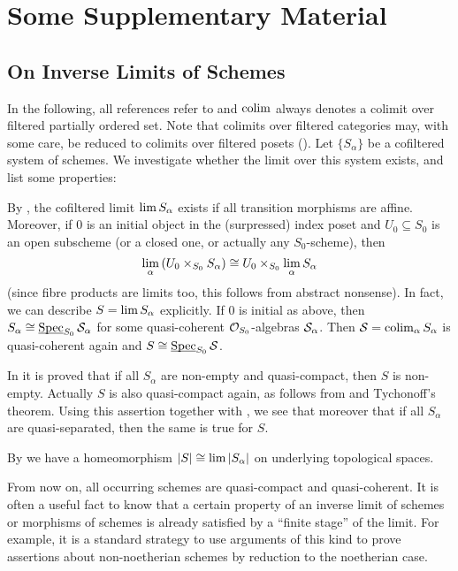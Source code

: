 \chapter{Some Supplementary Material}

\section{On Inverse Limits of Schemes}\label{sec:inverseLimits}
In the following, all references refer to \cite{stacks-project} and $\operatorname*{colim}$ always denotes a colimit over filtered partially ordered set. Note that colimits over filtered categories may, with some care, be reduced to colimits over filtered posets ().
\numpar{}\label{par:schemesInverseLimit}Let $\{S_\alpha\}$ be a cofiltered system of schemes. We investigate whether the limit over this system exists, and list some properties:
\begin{alphanumerate}
	\item By , the cofiltered limit $\operatorname*{lim} S_\alpha$ exists if all transition morphisms are affine. Moreover, if $0$ is an initial object in the (surpressed) index poset and $U_0\subseteq S_0$ is an open subscheme (or a closed one, or actually any $S_0$-scheme), then
	\begin{equation*}
	\operatorname*{lim}_\alpha \left(U_0\times_{S_0}S_\alpha\right)\cong U_0\times_{S_0}\operatorname*{lim}_\alpha S_\alpha
	\end{equation*}
	(since fibre products are limits too, this follows from abstract nonsense). In fact, we can describe $S=\operatorname*{lim} S_\alpha$ explicitly. If $0$ is initial as above, then $S_\alpha\cong \operatorname{\underline{\smash{\mathrm{Spec}}}}_{S_0}\mathcal{S}_\alpha$ for some quasi-coherent $\mathcal{O}_{S_0}$-algebras $\mathcal{S}_\alpha$. Then $\mathcal{S}=\operatorname*{colim}_\alpha S_\alpha$ is quasi-coherent again and $S\cong \operatorname{\underline{\smash{\mathrm{Spec}}}}_{S_0}\mathcal{S}$.
	\item In  it is proved that if all $S_\alpha$ are non-empty and quasi-compact, then $S$ is non-empty. Actually $S$ is also quasi-compact again, as follows from  and Tychonoff's theorem. Using this assertion together with , we see that moreover that if all $S_\alpha$ are quasi-separated, then the same is true for $S$.
	\item By  we have a homeomorphism $|S|\cong \operatorname*{lim} |S_\alpha|$ on underlying topological spaces.
\end{alphanumerate}
\numpar{}\label{par:descendingFinPres} From now on, all occurring schemes are quasi-compact and quasi-coherent. It is often a useful fact to know that a certain property of an inverse limit of schemes or morphisms of schemes is already satisfied by a \enquote{finite stage} of the limit. For example, it is a standard strategy to use arguments of this kind to prove assertions about non-noetherian schemes by reduction to the noetherian case.
